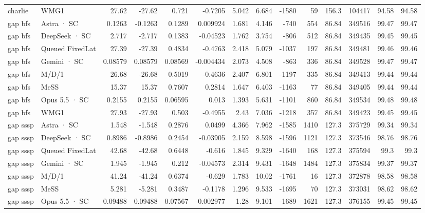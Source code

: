 \begin{tabular}{llrrrrrrrrrrrr}
charlie & WMG1 & 27.62 & -27.62 & 0.721 & -0.7205 & 5.042 & 6.684 & -1580 & 59 & 156.3 & 104417 & 94.58 & 94.58 \\
gap bfs & Astra · SC & 0.1263 & -0.1263 & 0.1289 & 0.009924 & 1.681 & 4.146 & -740 & 554 & 86.84 & 349516 & 99.47 & 99.47 \\
gap bfs & DeepSeek · SC & 2.717 & -2.717 & 0.1383 & -0.04523 & 1.762 & 3.754 & -806 & 512 & 86.84 & 349435 & 99.45 & 99.45 \\
gap bfs & Queued FixedLat & 27.39 & -27.39 & 0.4834 & -0.4763 & 2.418 & 5.079 & -1037 & 197 & 86.84 & 349481 & 99.46 & 99.46 \\
gap bfs & Gemini · SC & 0.08579 & 0.08579 & 0.08569 & -0.004434 & 2.073 & 4.508 & -863 & 336 & 86.84 & 349528 & 99.47 & 99.47 \\
gap bfs & M/D/1 & 26.68 & -26.68 & 0.5019 & -0.4636 & 2.407 & 6.801 & -1197 & 335 & 86.84 & 349413 & 99.44 & 99.44 \\
gap bfs & MeSS & 15.37 & 15.37 & 0.7607 & 0.2814 & 1.647 & 6.403 & -1163 & 77 & 86.84 & 349405 & 99.44 & 99.44 \\
gap bfs & Opus 5.5 · SC & 0.2155 & 0.2155 & 0.06595 & 0.013 & 1.393 & 5.631 & -1101 & 860 & 86.84 & 349534 & 99.48 & 99.48 \\
gap bfs & WMG1 & 27.93 & -27.93 & 0.503 & -0.4955 & 2.43 & 7.036 & -1218 & 357 & 86.84 & 349423 & 99.45 & 99.45 \\
gap sssp & Astra · SC & 1.548 & -1.548 & 0.2876 & 0.0499 & 4.366 & 7.962 & -1585 & 1410 & 127.3 & 375729 & 99.34 & 99.34 \\
gap sssp & DeepSeek · SC & 0.8986 & -0.8986 & 0.2454 & -0.03905 & 2.159 & 8.598 & -1596 & 1121 & 127.3 & 373546 & 98.76 & 98.76 \\
gap sssp & Queued FixedLat & 42.68 & -42.68 & 0.6448 & -0.616 & 1.845 & 9.329 & -1640 & 168 & 127.3 & 375594 & 99.3 & 99.3 \\
gap sssp & Gemini · SC & 1.945 & -1.945 & 0.212 & -0.04573 & 2.314 & 9.431 & -1648 & 1484 & 127.3 & 375834 & 99.37 & 99.37 \\
gap sssp & M/D/1 & 41.24 & -41.24 & 0.6374 & -0.629 & 1.783 & 10.02 & -1761 & 16 & 127.3 & 372878 & 98.58 & 98.58 \\
gap sssp & MeSS & 5.281 & -5.281 & 0.3487 & -0.1178 & 1.296 & 9.533 & -1695 & 70 & 127.3 & 373031 & 98.62 & 98.62 \\
gap sssp & Opus 5.5 · SC & 0.09488 & 0.09488 & 0.07567 & -0.002977 & 1.28 & 9.101 & -1689 & 1621 & 127.3 & 376155 & 99.45 & 99.45 \\

\end{tabular}

